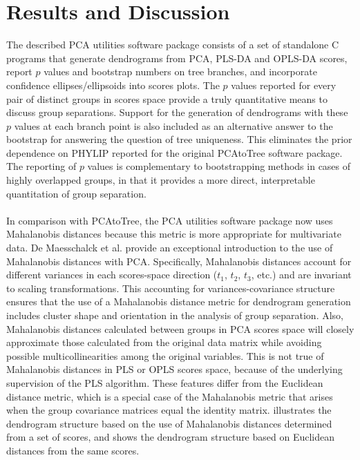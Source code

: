 \section{Results and Discussion}

\begin{doublespace}
The described PCA utilities software package consists of a set of standalone
C programs that generate dendrograms from PCA, PLS-DA and OPLS-DA scores,
report $p$ values and bootstrap numbers on tree branches, and incorporate
confidence ellipses/ellipsoids into scores plots. The $p$ values reported for
every pair of distinct groups in scores space provide a truly quantitative
means to discuss group separations. Support for the generation of dendrograms
with these $p$ values at each branch point is also included as an alternative
answer to the bootstrap for answering the question of tree uniqueness. This
eliminates the prior dependence on PHYLIP \cite{retief:mmbio2000}
reported for the original PCAtoTree \cite{werth:abio2010} software
package. The reporting of $p$ values is complementary to bootstrapping methods
in cases of highly overlapped groups, in that it provides a more direct,
interpretable quantitation of group separation.
\\\\
In comparison with PCAtoTree, the PCA utilities software package now uses
Mahalanobis distances because this metric is more appropriate for multivariate
data. De Maesschalck et al. \cite{demaesschalck:cils2000} provide an
exceptional introduction to the use of Mahalanobis distances with PCA.
Specifically, Mahalanobis distances account for different variances in each
scores-space direction ($t_1$, $t_2$, $t_3$, etc.) and are invariant
to scaling transformations. This accounting for variances-covariance structure
ensures that the use of a Mahalanobis distance metric for dendrogram generation
includes cluster shape and orientation in the analysis of group separation.
Also, Mahalanobis distances calculated between groups in PCA scores space will
closely approximate those calculated from the original data matrix while
avoiding possible multicollinearities among the original variables. This is
not true of Mahalanobis distances in PLS or OPLS scores space, because of the
underlying supervision of the PLS algorithm. These features differ from the
Euclidean distance metric, which is a special case of the Mahalanobis metric
that arises when the group covariance matrices equal the identity matrix.
 illustrates the dendrogram structure based on the
use of Mahalanobis distances determined from a set of scores, and
 shows the dendrogram structure based on
Euclidean distances from the same scores.
\end{doublespace}

